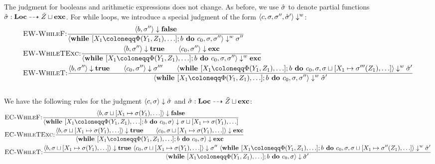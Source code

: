 \begin{landscape}
The judgment for booleans and arithmetic expressions does not change.
As before, we use $\hat{\sigma}{}$ to denote partial functions
$\hat{\sigma}{}: \textbf{Loc} \dashrightarrow \tilde{Z} \sqcup \textbf{exc}$.
For while loops, we introduce a special judgment of the form $\bigstepw{c}{\sigma, \sigma''}{\excstore'{}}$:
\begin{align*}
    &\bsrule{EW-WhileF}{\bigstep{b}{\store''}{\bfalse}}
    {\bigstepw{\defaultssawhile}{\store}{\store''}{\store''}}\\
    &\bsrule{EW-WhileTExc}{\bigstep{b}{\store''}{\btrue} \qquad 
    \bigstep{c_0}{\store''}{\exception}}
    {\bigstepw{\defaultssawhile}{\store}{\store''}{\exception}}\\
    &\bsrule{EW-WhileT}{\bigstep{b}{\store''}{\btrue} \qquad 
    \bigstep{c_0}{\store''}{\store'''} \qquad 
    \bigstepw{\defaultssawhile}{\store}{\rightstoreassign{\store}{\store'''}}{\excstore'}}
    {\bigstepw{\defaultssawhile}{\store}{\store''}{\excstore'}}\\
 \end{align*}
\\
We have the following rules for the judgment $\langle c, \sigma \rangle \downarrow \hat{\sigma}{}$
and $\hat{\sigma}{}: \textbf{Loc} \dashrightarrow \tilde{Z} \sqcup \textbf{exc}$:
\begin{align*}
    &\bsrule{EC-WhileF}{\bigstep{b}{\leftstoreassign{\store}{\store}}{\bfalse}}
    {\bigstep{\defaultssawhile}{\sigma}{\leftstoreassign{\store}{\store}}}\\
    &\bsrule{EC-WhileTExc}{\bigstep{b}{\leftstoreassign{\store}{\store}}{\btrue} \qquad 
    \bigstep{c_0}{\leftstoreassign{\store}{\store}}{\exception}}
    {\bigstep{\defaultssawhile}{\sigma}{\exception}}\\
    &\bsrule{EC-WhileT}{\bigstep{b}{\leftstoreassign{\store}{\store}}{\btrue} \  
    \bigstep{c_0}{\leftstoreassign{\store}{\store}}{\store''} \ 
    \bigstepw{\defaultssawhile}{\store}{\rightstoreassign{\store}{\store''}}{\excstore'}}
    {\bigstep{\defaultssawhile}{\store}{\excstore'}}\\
\end{align*}
\end{landscape}

